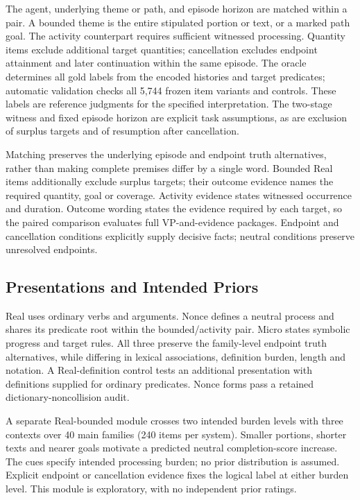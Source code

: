 \documentclass[sigconf,anonymous,review]{acmart}
\begin{document}
The agent, underlying theme or path, and episode horizon are matched within a pair. A bounded theme is the entire stipulated portion or text, or a marked path goal. The activity counterpart requires sufficient witnessed processing. Quantity items exclude additional target quantities; cancellation excludes endpoint attainment and later continuation within the same episode. The oracle determines all gold labels from the encoded histories and target predicates; automatic validation checks all 5,744 frozen item variants and controls. These labels are reference judgments for the specified interpretation. The two-stage witness and fixed episode horizon are explicit task assumptions, as are exclusion of surplus targets and of resumption after cancellation.



Matching preserves the underlying episode and endpoint truth alternatives, rather than making complete premises differ by a single word. Bounded Real items additionally exclude surplus targets; their outcome evidence names the required quantity, goal or coverage. Activity evidence states witnessed occurrence and duration. Outcome wording states the evidence required by each target, so the paired comparison evaluates full VP-and-evidence packages. Endpoint and cancellation conditions explicitly supply decisive facts; neutral conditions preserve unresolved endpoints.

\subsection{Presentations and Intended Priors}
Real uses ordinary verbs and arguments. Nonce defines a neutral process and shares its predicate root within the bounded/activity pair. Micro states symbolic progress and target rules. All three preserve the family-level endpoint truth alternatives, while differing in lexical associations, definition burden, length and notation. A Real-definition control tests an additional presentation with definitions supplied for ordinary predicates. Nonce forms pass a retained dictionary-noncollision audit.

A separate Real-bounded module crosses two intended burden levels with three contexts over 40 main families (240 items per system). Smaller portions, shorter texts and nearer goals motivate a predicted neutral completion-score increase. The cues specify intended processing burden; no prior distribution is assumed. Explicit endpoint or cancellation evidence fixes the logical label at either burden level. This module is exploratory, with no independent prior ratings.
\end{document}
